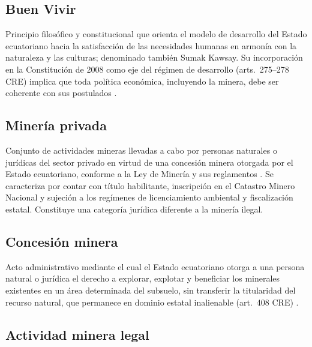 \subsection{Buen Vivir}

Principio filosófico y constitucional que orienta el modelo de desarrollo del Estado ecuatoriano hacia la satisfacción de las necesidades humanas en armonía con la naturaleza y las culturas; denominado también Sumak Kawsay. Su incorporación en la Constitución de 2008 como eje del régimen de desarrollo (arts.\ 275--278 CRE) implica que toda política económica, incluyendo la minera, debe ser coherente con sus postulados \parencite{cre_2008}.

\subsection{Minería privada}

Conjunto de actividades mineras llevadas a cabo por personas naturales o jurídicas del sector privado en virtud de una concesión minera otorgada por el Estado ecuatoriano, conforme a la Ley de Minería y sus reglamentos \parencite{ley_mineria_2025}. Se caracteriza por contar con título habilitante, inscripción en el Catastro Minero Nacional y sujeción a los regímenes de licenciamiento ambiental y fiscalización estatal. Constituye una categoría jurídica diferente a la minería ilegal.

\subsection{Concesión minera}

Acto administrativo mediante el cual el Estado ecuatoriano otorga a una persona natural o jurídica el derecho a explorar, explotar y beneficiar los minerales existentes en un área determinada del subsuelo, sin transferir la titularidad del recurso natural, que permanece en dominio estatal inalienable (art.\ 408 CRE) \parencite{cre_2008,ley_mineria_2025}.

\subsection{Actividad minera legal}

